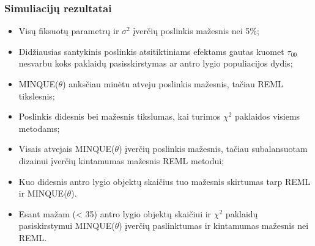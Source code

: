 \documentclass[utf8,hyperref={unicode,pdftex}]{beamer}
\begin{document}
\begin{frame}
\frametitle{Simuliacijų rezultatai}
\begin{itemize}
\item Visų fiksuotų parametrų ir $\sigma^2$ įverčių poslinkis mažesnis nei 5\%;
\item Didžiausias santykinis poslinkis atsitiktiniams efektams gautas kuomet $\tau_{00}$ nesvarbu koks paklaidų pasisskirstymas ar antro lygio populiacijos dydis;
\item MINQUE($\theta$) anksčiau minėtu atveju poslinkis mažesnis, tačiau REML tikslesnis;
\item Poslinkis didesnis bei mažesnis tikslumas, kai turimos $\chi^2$ paklaidos visiems metodams;
\item Visais atvejais MINQUE($\theta$) įverčių poslinkis mažesnis, tačiau subalansuotam dizainui įverčių kintamumas mažesnis REML metodui;
\item Kuo didesnis antro lygio objektų skaičius tuo mažesnis skirtumas tarp REML ir MINQUE($\theta$).
\item Esant mažam (< 35) antro lygio objektų skaičiui ir $\chi^2$ paklaidų pasiskirstymui MINQUE($\theta$) įverčių paslinktumas ir kintamumas mažesnis nei REML.
\end{itemize}
\end{frame}
\end{document}
